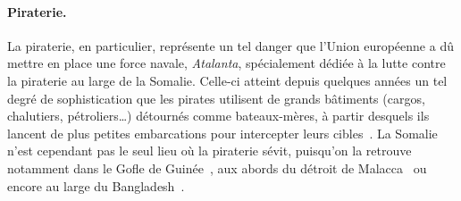 	\paragraph{Piraterie.}
	La piraterie, en particulier, représente un tel danger que l'Union européenne a dû mettre en place une force navale, \emph{Atalanta}\footnotemark, spécialement dédiée à la lutte contre la piraterie au large de la Somalie. Celle-ci atteint depuis quelques années un tel degré de sophistication que les pirates utilisent de grands bâtiments (cargos, chalutiers, pétroliers\ldots{}) détournés comme bateaux-mères, à partir desquels ils lancent de plus petites embarcations pour intercepter leurs cibles~\cite{audebaud2010lutte, guisnel2012pirates, dumas2015}. La Somalie n'est cependant pas le seul lieu où la piraterie sévit, puisqu'on la retrouve notamment dans le Gofle de Guinée~\cite{onuoha2012piracy}, aux abords du détroit de Malacca~\cite{raymond2009piracy} ou encore au large du Bangladesh~\cite{liss2011oceans}.
	
	
